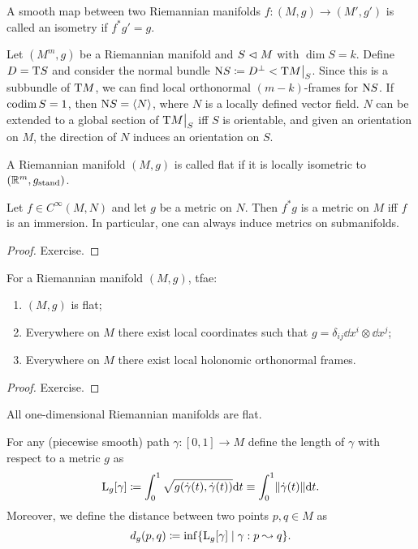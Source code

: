 \begin{defn}[Isometry]
A smooth map between two Riemannian manifolds $f:(M,g)\to(M',g')$ is called an isometry if $f^\ast g'=g$.
\end{defn}

\begin{cor}
Let $(M^m,g)$ be a Riemannian manifold and $S\vartriangleleft M$ with $\dim S=k$. Define $D=\mathrm{T} S$ and consider the normal bundle $\rmN S\coloneqq D^\perp<\restr{\T M}{S}$. Since this is a subbundle of $\mathrm{T} M$, we can find local orthonormal $(m-k)$-frames for $\mathrm{N} S$. If $\operatorname{codim} S=1$, then $\mathrm{N} S=\left\langle N\right\rangle$, where $N$ is a locally defined vector field. $N$ can be extended to a global section of $\restr{\T M}{S}$ iff $S$ is orientable, and given an orientation on $M$, the direction of $N$ induces an orientation on $S$.
\end{cor}


\begin{defn}
A Riemannian manifold $(M,g)$ is called flat if it is locally isometric to $(\mathbb{R}^m,g_{\text{stand}})$.
\end{defn}


\begin{thm}
Let $f\in C^\infty(M,N)$ and let $g$ be a metric on $N$. Then $f^\ast g$ is a metric on $M$ iff $f$ is an immersion. In particular, one can always induce metrics on submanifolds.
\end{thm}
\begin{proof}
Exercise.
\end{proof}

\begin{thm}
For a Riemannian manifold $(M,g)$,  \gls{tfae}:
\begin{enumerate}
    \item $(M,g)$ is flat;
    \item Everywhere on $M$ there exist local coordinates such that $g=\delta_{ij} \dd x^i\otimes \dd x^j$;
    \item Everywhere on $M$ there exist local holonomic orthonormal frames.
\end{enumerate}
\end{thm}
\begin{proof}
Exercise.
\end{proof}
\begin{cor}
All one-dimensional Riemannian manifolds are flat.
\end{cor}


\begin{defn}
    For any (piecewise smooth) path $\gamma:[0,1]\to M$ define the length of $\gamma$ with respect to a metric $g$ as
    \[\mathrm{L}_g[\gamma]\coloneqq \int_0^1 \sqrt{g(\dot\gamma(t),\dot\gamma(t))}{\mathrm{d}} t \equiv \int_0^1 \lVert\dot\gamma(t)\rVert {\mathrm{d}} t.\]
    Moreover, we define the distance between two points $p,q\in M$ as 
    \[d_g(p,q)\coloneqq \inf \{\mathrm{L}_g[\gamma]\mid \gamma:p\leadsto q\}.\]
\end{defn}

